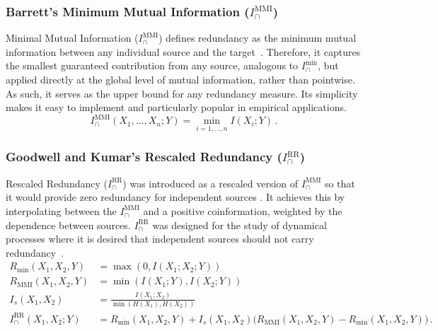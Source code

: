 \documentclass{article}
\newcommand{\XsY}{X_1,\ldots,X_n;Y}
\newcommand{\Imin}{\ensuremath{I_\cap^{\text{min}}}\xspace}
\newcommand{\IMMI}{\ensuremath{I_\cap^{\text{MMI}}}\xspace}
\newcommand{\IRR}{\ensuremath{I_\cap^{\text{RR}}}\xspace}
\begin{document}
\subsubsection*{Barrett's Minimum Mutual Information ($\IMMI$)}
Minimal Mutual Information (\IMMI) defines redundancy as the minimum mutual information between any individual source and the target~\cite{barrett2015exploration}. Therefore, it captures the smallest guaranteed contribution from any source, analogous to $\Imin$, but applied directly at the global level of mutual information, rather than pointwise. As such, it serves as the upper bound for any redundancy measure. Its simplicity makes it easy to implement and particularly popular in empirical applications.
\begin{equation}
    I_\cap^{\text{MMI}}(\XsY) = \min_{i=1,\ldots,n}I(X_i;Y) \,.
\end{equation}

\subsubsection*{Goodwell and Kumar's Rescaled Redundancy ($\IRR$)}
Rescaled Redundancy ($\IRR$) was introduced as a rescaled version of $\IMMI$ so that it would provide zero redundancy for independent sources \cite{goodwell2017temporal}. It achieves this by interpolating between the $\IMMI$ and a positive coinformation, weighted by the dependence between sources. $\IRR$ was designed for the study of dynamical processes where it is desired that independent sources should not carry redundancy~\cite{goodwell2017temporal}. 
    \begin{align}
        R_{\min}(X_1,X_2,Y) & = \max(0, I(X_1;X_2;Y))  \\
        R_{\text{MMI}}(X_1,X_2,Y) & = \min(I(X_1;Y),I(X_2;Y))  \\
        I_s(X_1,X_2) & = \frac{I(X_1;X_2)}{\min(H(X_1),H(X_2))} \\
        I_\cap^{\text{RR}}(X_1,X_2;Y) & = R_{\min}(X_1,X_2,Y) + I_s(X_1,X_2)\bigl(R_{\text{MMI}}(X_1,X_2,Y)-R_{\min}(X_1,X_2,Y)\bigr) \,.
    \end{align}
\end{document}
